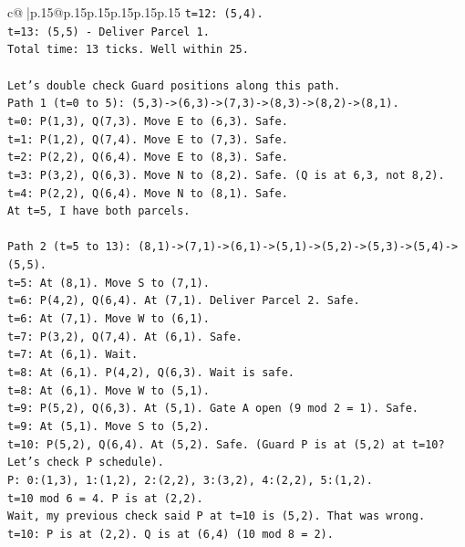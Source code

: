 \documentclass{article}
\begin{document}
{\begin{supertabular}{c@{$\;$}|p{.15\linewidth}@{}p{.15\linewidth}p{.15\linewidth}p{.15\linewidth}p{.15\linewidth}p{.15\linewidth}}
{{{\texttt{t=12: (5,4).} \\
\texttt{t=13: (5,5) {-} Deliver Parcel 1.} \\
\texttt{Total time: 13 ticks. Well within 25.} \\
\\ 
\texttt{Let's double check Guard positions along this path.} \\
\texttt{Path 1 (t=0 to 5): (5,3){-}>(6,3){-}>(7,3){-}>(8,3){-}>(8,2){-}>(8,1).} \\
\texttt{t=0: P(1,3), Q(7,3). Move E to (6,3). Safe.} \\
\texttt{t=1: P(1,2), Q(7,4). Move E to (7,3). Safe.} \\
\texttt{t=2: P(2,2), Q(6,4). Move E to (8,3). Safe.} \\
\texttt{t=3: P(3,2), Q(6,3). Move N to (8,2). Safe. (Q is at 6,3, not 8,2).} \\
\texttt{t=4: P(2,2), Q(6,4). Move N to (8,1). Safe.} \\
\texttt{At t=5, I have both parcels.} \\
\\ 
\texttt{Path 2 (t=5 to 13): (8,1){-}>(7,1){-}>(6,1){-}>(5,1){-}>(5,2){-}>(5,3){-}>(5,4){-}>(5,5).} \\
\texttt{t=5: At (8,1). Move S to (7,1).} \\
\texttt{t=6: P(4,2), Q(6,4). At (7,1). Deliver Parcel 2. Safe.} \\
\texttt{t=6: At (7,1). Move W to (6,1).} \\
\texttt{t=7: P(3,2), Q(7,4). At (6,1). Safe.} \\
\texttt{t=7: At (6,1). Wait.} \\
\texttt{t=8: At (6,1). P(4,2), Q(6,3). Wait is safe.} \\
\texttt{t=8: At (6,1). Move W to (5,1).} \\
\texttt{t=9: P(5,2), Q(6,3). At (5,1). Gate A open (9 mod 2 = 1). Safe.} \\
\texttt{t=9: At (5,1). Move S to (5,2).} \\
\texttt{t=10: P(5,2), Q(6,4). At (5,2). Safe. (Guard P is at (5,2) at t=10? Let's check P schedule).} \\
\texttt{P: 0:(1,3), 1:(1,2), 2:(2,2), 3:(3,2), 4:(2,2), 5:(1,2).} \\
\texttt{t=10 mod 6 = 4. P is at (2,2).} \\
\texttt{Wait, my previous check said P at t=10 is (5,2). That was wrong.} \\
\texttt{t=10: P is at (2,2). Q is at (6,4) (10 mod 8 = 2).} \\
}}}
\end{supertabular}}
\end{document}
